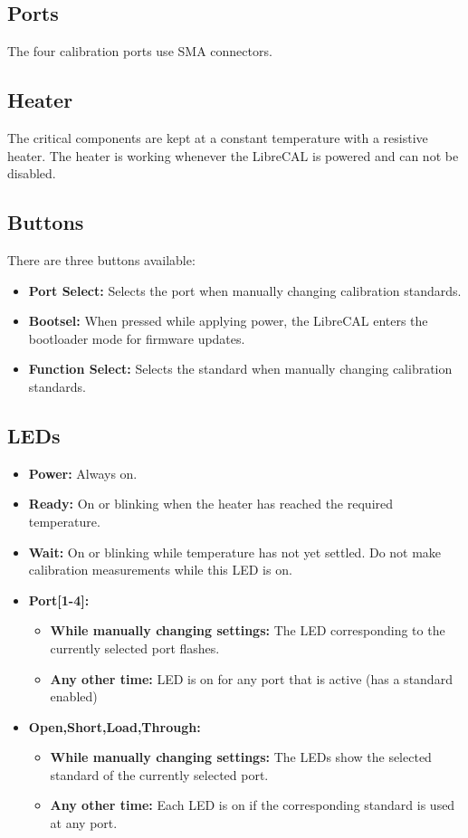 \documentclass[a4paper,11pt]{article}
\newcommand{\dev}{LibreCAL}
\begin{document}
\subsection{Ports}
The four calibration ports use SMA connectors.

\subsection{Heater}
The critical components are kept at a constant temperature with a resistive heater. The heater is working whenever the \dev{} is powered and can not be disabled.

\subsection{Buttons}
There are three buttons available:
\begin{itemize}
\item \textbf{Port Select:} Selects the port when manually changing calibration standards.
\item \textbf{Bootsel:} When pressed while applying power, the \dev{} enters the bootloader mode for firmware updates.
\item \textbf{Function Select:} Selects the standard when manually changing calibration standards.
\end{itemize}

\subsection{LEDs}
\begin{itemize}
\item \textbf{Power:} Always on.
\item \textbf{Ready:} On or blinking when the heater has reached the required temperature.
\item \textbf{Wait:} On or blinking while temperature has not yet settled. Do not make calibration measurements while this LED is on.
\item \textbf{Port[1-4]:}
\begin{itemize}
\item \textbf{While manually changing settings:} The LED corresponding to the currently selected port flashes.
\item \textbf{Any other time:} LED is on for any port that is active (has a standard enabled)
\end{itemize}
\item \textbf{Open,Short,Load,Through:}
\begin{itemize}
\item \textbf{While manually changing settings:} The LEDs show the selected standard of the currently selected port.
\item \textbf{Any other time:} Each LED is on if the corresponding standard is used at any port.
\end{itemize}
\end{itemize}
\end{document}
